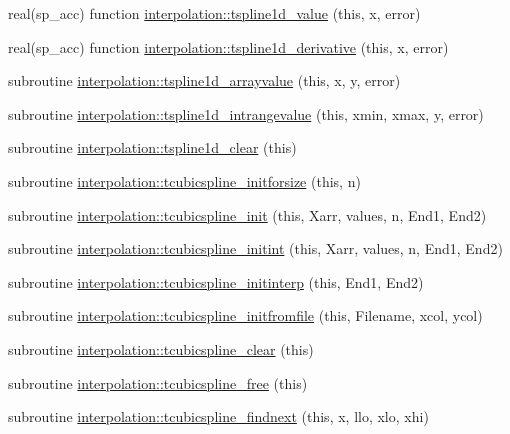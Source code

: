 \begin{DoxyCompactItemize}
\item 
real(sp\+\_\+acc) function \mbox{\hyperlink{namespaceinterpolation_a7a675d7e22aea0d85c1c2241ee6c221f}{interpolation\+::tspline1d\+\_\+value}} (this, x, error)
\item 
real(sp\+\_\+acc) function \mbox{\hyperlink{namespaceinterpolation_aec275a9deb7e4578d9d8c310b0dea093}{interpolation\+::tspline1d\+\_\+derivative}} (this, x, error)
\item 
subroutine \mbox{\hyperlink{namespaceinterpolation_a1bb0d4fae1b5125618e2e9f67669bd3c}{interpolation\+::tspline1d\+\_\+arrayvalue}} (this, x, y, error)
\item 
subroutine \mbox{\hyperlink{namespaceinterpolation_aa9eedb8594564e9a0e57ee8a5282837a}{interpolation\+::tspline1d\+\_\+intrangevalue}} (this, xmin, xmax, y, error)
\item 
subroutine \mbox{\hyperlink{namespaceinterpolation_ab31f5a781a449692250e4a0ab0ec432c}{interpolation\+::tspline1d\+\_\+clear}} (this)
\item 
subroutine \mbox{\hyperlink{namespaceinterpolation_a7f58be276bbe7b10b95a7e156a4bc0b8}{interpolation\+::tcubicspline\+\_\+initforsize}} (this, n)
\item 
subroutine \mbox{\hyperlink{namespaceinterpolation_a36b9a543d32de4944ae9289358f15a5a}{interpolation\+::tcubicspline\+\_\+init}} (this, Xarr, values, n, End1, End2)
\item 
subroutine \mbox{\hyperlink{namespaceinterpolation_aa6887491230c995c13b123b7847269ec}{interpolation\+::tcubicspline\+\_\+initint}} (this, Xarr, values, n, End1, End2)
\item 
subroutine \mbox{\hyperlink{namespaceinterpolation_a141de3ad802bf42f3810c24e47e31310}{interpolation\+::tcubicspline\+\_\+initinterp}} (this, End1, End2)
\item 
subroutine \mbox{\hyperlink{namespaceinterpolation_a89e495ca87c6f696d6aac646fd227f03}{interpolation\+::tcubicspline\+\_\+initfromfile}} (this, Filename, xcol, ycol)
\item 
subroutine \mbox{\hyperlink{namespaceinterpolation_aef383fa49a233bca20a6cd742319df7e}{interpolation\+::tcubicspline\+\_\+clear}} (this)
\item 
subroutine \mbox{\hyperlink{namespaceinterpolation_a953dc25c7196a60416148edc8944b39e}{interpolation\+::tcubicspline\+\_\+free}} (this)
\item 
subroutine \mbox{\hyperlink{namespaceinterpolation_a2ffb9d3c161ab80ba29f5256b039ea57}{interpolation\+::tcubicspline\+\_\+findnext}} (this, x, llo, xlo, xhi)

\end{DoxyCompactItemize}
